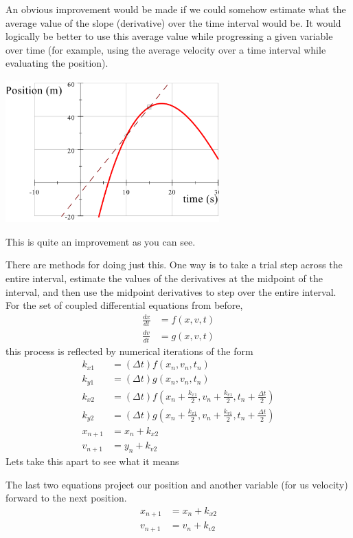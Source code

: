 \documentclass{book}
\begin{document}
An obvious improvement would be made if we could somehow estimate what the
average value of the slope (derivative) over the time interval would be. It
would logically be better to use this average value while progressing a given
variable over time (for example, using the average velocity over a time
interval while evaluating the position).
\begin{center}
\includegraphics[natheight=2.159400in,natwidth=3.239600in,height=2.1594in,width=3.2396in]{Lab7_figs/Parab2Points.png}
\end{center}
This is quite an improvement as you can see.

There are methods for doing just this. One way is to take a trial step across
the entire interval, estimate the values of the derivatives at the midpoint of
the interval, and then use the midpoint derivatives to step over the entire
interval. For the set of coupled differential equations from before,
\begin{align*}
\frac{dx}{dt}  & =f(x,v,t)\\
\frac{dv}{dt}  & =g(x,v,t)
\end{align*}
this process is reflected by numerical iterations of the form
\begin{align*}
k_{x1}  & =(\Delta t)f(x_{n},v_{n},t_{n})\\
k_{y1}  & =(\Delta t)g(x_{n},v_{n},t_{n})\\
k_{x2}  & =(\Delta t)f\left(  x_{n}+\frac{k_{x1}}{2},v_{n}+\frac{k_{v1}} {2},t_{n}+\frac{\Delta t}{2}\right) \\
k_{y2}  & =(\Delta t)g\left(  x_{n}+\frac{k_{x1}}{2},v_{n}+\frac{k_{v1}} {2},t_{n}+\frac{\Delta t}{2}\right) \\
x_{n+1}  & =x_{n}+k_{x2}\\
v_{n+1}  & =y_{n}+k_{v2} 
\end{align*}
Lets take this apart to see what it means

The last two equations project our position and another variable (for us
velocity) forward to the next position. 
\begin{align*}
x_{n+1}  & =x_{n}+k_{x2}\\
v_{n+1}  & =v_{n}+k_{v2} \end{align*}
\end{document}

